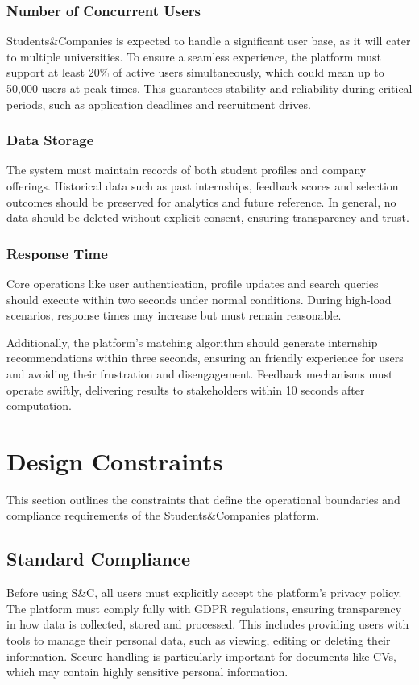 \subsubsection{Number of Concurrent Users}
Students\&Companies is expected to handle a significant user base, as it will cater to multiple universities.
To ensure a seamless experience, the platform must support at least 20\% of active users simultaneously, which could mean up to 50,000 users at peak times.
This guarantees stability and reliability during critical periods, such as application deadlines and recruitment drives.

\subsubsection{Data Storage}
The system must maintain records of both student profiles and company offerings.
Historical data such as past internships, feedback scores and selection outcomes should be preserved for analytics and future reference.
In general, no data should be deleted without explicit consent, ensuring transparency and trust.

\subsubsection{Response Time}
Core operations like user authentication, profile updates and search queries should execute within two seconds under normal conditions.
During high-load scenarios, response times may increase but must remain reasonable.

Additionally, the platform's matching algorithm should generate internship recommendations within three seconds, ensuring an friendly experience for users and avoiding their frustration and disengagement.
Feedback mechanisms must operate swiftly, delivering results to stakeholders within 10 seconds after computation.

\section{Design Constraints}
This section outlines the constraints that define the operational boundaries and compliance requirements of the Students\&Companies platform.

\subsection{Standard Compliance}
Before using S\&C, all users must explicitly accept the platform's privacy policy.
The platform must comply fully with GDPR regulations, ensuring transparency in how data is collected, stored and processed.
This includes providing users with tools to manage their personal data, such as viewing, editing or deleting their information.
Secure handling is particularly important for documents like CVs, which may contain highly sensitive personal information.


